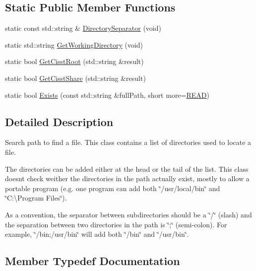 \subsection*{Static Public Member Functions}
\begin{DoxyCompactItemize}
\item 
static const std\+::string \& \hyperlink{classcmn_path_abe1c6a1601b0e8bfb17001c96dc15c4f}{Directory\+Separator} (void)
\item 
static std\+::string \hyperlink{classcmn_path_a713c763f4435a4f584d827a457ca66d9}{Get\+Working\+Directory} (void)
\item 
static bool \hyperlink{classcmn_path_af7a1de336b73417f478648eb8d9b103c}{Get\+Cisst\+Root} (std\+::string \&result)
\item 
static bool \hyperlink{classcmn_path_a5a8c437511b2257ff31eeb7fce0c7b61}{Get\+Cisst\+Share} (std\+::string \&result)
\item 
static bool \hyperlink{classcmn_path_adf86564a090b5e585d749d233e25424b}{Exists} (const std\+::string \&full\+Path, short more=\hyperlink{group__cisst_common_gga15dacf9562d80d5b7eb9b849726e768caea0bb09a4a02da90f6c172531cd17a05}{R\+E\+A\+D})
\end{DoxyCompactItemize}


\subsection{Detailed Description}
Search path to find a file. This class contains a list of directories used to locate a file. 

The directories can be added either at the head or the tail of the list. This class doesn\textquotesingle{}t check weither the directories in the path actually exist, mostly to allow a portable program (e.\+g. one program can add both \char`\"{}/usr/local/bin\char`\"{} and \char`\"{}\+C\+:\textbackslash{}\+Program Files\char`\"{}).

As a convention, the separator between subdirectories should be a \char`\"{}/\char`\"{} (slash) and the separation between two directories in the path is \char`\"{};\char`\"{} (semi-\/colon). For example, \char`\"{}/bin;/usr/bin\char`\"{} will add both \char`\"{}/bin\char`\"{} and \char`\"{}/usr/bin\char`\"{}. 

\subsection{Member Typedef Documentation}
\hypertarget{classcmn_path_a9e313220d7a856280a1dff97d73c61f8}{}

